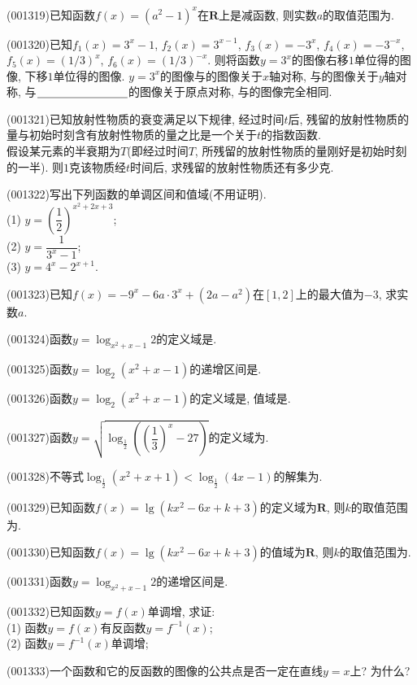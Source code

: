 \item (001319)已知函数$f(x)=(a^2-1)^x$在$\mathbf{R}$上是减函数, 则实数$a$的取值范围为.
\item (001320)已知$f_1(x)=3^x-1$, $f_2(x)=3^{x-1}$, $f_3(x)=-3^x$, $f_4(x)=-3^{-x}$, $f_5(x)=(1/3)^x$, $f_6(x)=(1/3)^{-x}$. 则将函数$y=3^x$的图像右移$1$单位得的图像, 下移$1$单位得的图像. $y=3^x$的图像与的图像关于$x$轴对称, 与的图像关于$y$轴对称, 与$\blank{80}$的图像关于原点对称, 与的图像完全相同.
\item (001321)已知放射性物质的衰变满足以下规律, 经过时间$t$后, 残留的放射性物质的量与初始时刻含有放射性物质的量之比是一个关于$t$的指数函数.\\ 
假设某元素的半衰期为$T$(即经过时间$T$, 所残留的放射性物质的量刚好是初始时刻的一半). 则$1$克该物质经$t$时间后, 求残留的放射性物质还有多少克.
\item (001322)写出下列函数的单调区间和值域(不用证明).\\ 
(1) $y=\left(\dfrac{1}{2}\right)^{x^2+2x+3}$;\\ 
(2) $y=\dfrac{1}{3^x-1}$;\\ 
(3) $y=4^x-2^{x+1}$.
\item (001323)已知$f(x)=-9^x-6a\cdot 3^x+(2a-a^2)$在$[1,2]$上的最大值为$-3$, 求实数$a$.
\item (001324)函数$y=\log_{x^2+x-1} 2$的定义域是.
\item (001325)函数$y=\log_2(x^2+x-1)$的递增区间是.
\item (001326)函数$y=\log_2(x^2+x-1)$的定义域是, 值域是.
\item (001327)函数$y=\sqrt{\log_{\frac{1}{2}}\left(\left(\dfrac{1}{3}\right)^x-27\right)}$的定义域为.
\item (001328)不等式$\log_{\frac{1}{2}}(x^2+x+1)<\log_{\frac{1}{2}}(4x-1)$的解集为.
\item (001329)已知函数$f(x)=\lg(kx^2-6x+k+3)$的定义域为$\mathbf{R}$, 则$k$的取值范围为.
\item (001330)已知函数$f(x)=\lg(kx^2-6x+k+3)$的值域为$\mathbf{R}$, 则$k$的取值范围为.
\item (001331)函数$y=\log_{x^2+x-1} 2$的递增区间是.
\item (001332)已知函数$y=f(x)$单调增, 求证:\\ 
(1) 函数$y=f(x)$有反函数$y=f^{-1}(x)$;\\ 
(2) 函数$y=f^{-1}(x)$单调增;
\item (001333)一个函数和它的反函数的图像的公共点是否一定在直线$y=x$上? 为什么?
